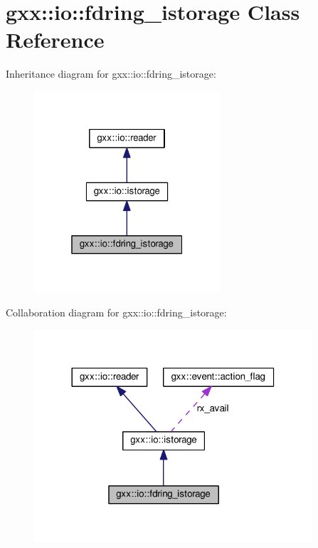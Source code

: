 \hypertarget{classgxx_1_1io_1_1fdring__istorage}{}\section{gxx\+:\+:io\+:\+:fdring\+\_\+istorage Class Reference}
\label{classgxx_1_1io_1_1fdring__istorage}


Inheritance diagram for gxx\+:\+:io\+:\+:fdring\+\_\+istorage\+:
\nopagebreak
\begin{figure}[H]
\begin{center}
\leavevmode
\includegraphics[width=196pt]{classgxx_1_1io_1_1fdring__istorage__inherit__graph}
\end{center}
\end{figure}


Collaboration diagram for gxx\+:\+:io\+:\+:fdring\+\_\+istorage\+:
\nopagebreak
\begin{figure}[H]
\begin{center}
\leavevmode
\includegraphics[width=293pt]{classgxx_1_1io_1_1fdring__istorage__coll__graph}
\end{center}
\end{figure}
